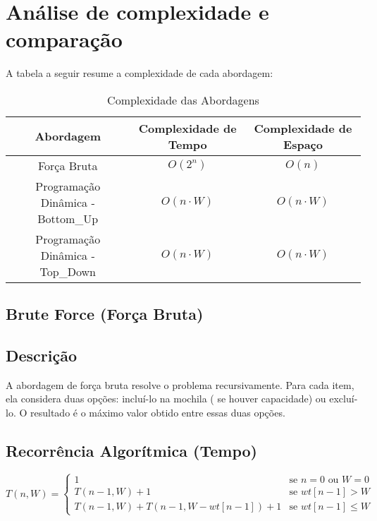 \section{Análise de complexidade e comparação}

A tabela a seguir resume a complexidade de cada abordagem:

\begin{table}[h]
  \centering
  \caption{Complexidade das Abordagens}
  \begin{tabular}{|c|c|c|}
    \hline
    \textbf{Abordagem} & \textbf{Complexidade de Tempo} & \textbf{Complexidade de Espaço} \\ \hline
    Força Bruta                        & \(O(2^n)\)                       & \(O(n)\)                        \\ \hline
    Programação Dinâmica - Bottom\_Up  & \(O(n \cdot W)\)                 & \(O(n \cdot W)\)                \\ \hline
    Programação Dinâmica - Top\_Down   & \(O(n \cdot W)\)                 & \(O(n \cdot W)\)                \\ \hline
  \end{tabular}
\end{table}



\subsection{Brute Force (Força Bruta)}
\subsection*{Descrição}
A abordagem de força bruta resolve o problema recursivamente. Para cada item, ela considera duas opções: incluí-lo na mochila (
se houver capacidade) ou excluí-lo. O resultado é o máximo valor obtido entre essas duas opções.

\subsection*{Recorrência Algorítmica (Tempo)}
\[
T(n, W) = 
\begin{cases}
1 & \text{se } n = 0 \text{ ou } W = 0 \\
T(n - 1, W) + 1 & \text{se } wt[n - 1] > W \\
T(n - 1, W) + T(n - 1, W - wt[n - 1]) + 1 & \text{se } wt[n - 1] \leq W
\end{cases}
\]

